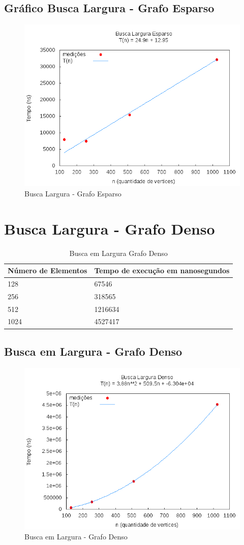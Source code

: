 \documentclass[12pt,a4paper,twoside]{report}
\begin{document}
\subsection{Gráfico Busca Largura - Grafo Esparso}
\begin{figure}[H]
    \centering
    \includegraphics[width=0.7\linewidth]{graficos/BuscaLargura/Esparso/Esparso.png}
  \caption{Busca Largura - Grafo Esparso}
\end{figure}

\section{Busca Largura - Grafo Denso}

\begin{table}[H]
\centering
\caption{Busca em Largura Grafo Denso}
\label{my-label}
\begin{tabular}{|l|l|}
\hline
\multicolumn{1}{|c|}{\textbf{Número de Elementos}} & \multicolumn{1}{c|}{\textbf{Tempo de execução em nanosegundos}} \\ \hline
128 & 67546 \\ \hline
256 & 318565 \\ \hline
512 & 1216634 \\ \hline
1024 & 4527417 \\ \hline
\end{tabular}
\end{table}

\subsection{Busca em Largura - Grafo Denso}
\begin{figure}[H]
    \centering
    \includegraphics[width=0.7\linewidth]{graficos/BuscaLargura/Denso/Denso.png}
  \caption{Busca em Largura - Grafo Denso}
\end{figure}
\end{document}
